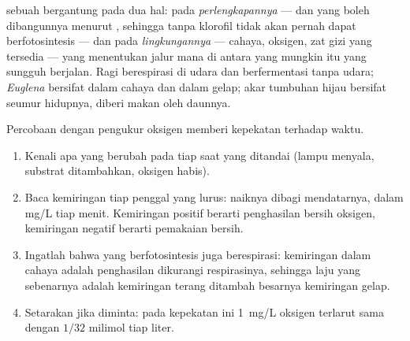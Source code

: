 \begin{proposition}\label{prop:g10:cell-metabolism:decides}
 sebuah  bergantung pada dua hal: pada
\emph{perlengkapannya} ---  dan  yang boleh dibangunnya
menurut , sehingga  tanpa klorofil tidak akan pernah dapat
berfotosintesis --- dan pada \emph{lingkungannya} --- cahaya, oksigen,
zat gizi yang tersedia --- yang menentukan jalur mana di antara yang
mungkin itu yang sungguh berjalan. Ragi berespirasi di udara dan
berfermentasi tanpa udara; \emph{Euglena} bersifat  dalam
cahaya dan  dalam gelap;  akar tumbuhan hijau bersifat
 seumur hidupnya, diberi makan oleh daunnya.
\end{proposition}
\admitted

\begin{method}\label{met:g10:cell-metabolism:trace}
Percobaan dengan pengukur oksigen memberi kepekatan terhadap waktu.
\begin{enumerate}
  \item Kenali apa yang berubah pada tiap saat yang ditandai (lampu
        menyala, substrat ditambahkan, oksigen habis).
  \item Baca kemiringan tiap penggal yang lurus: naiknya dibagi
        mendatarnya, dalam \unit{mg/L} tiap menit. Kemiringan positif
        berarti penghasilan bersih oksigen, kemiringan negatif berarti
        pemakaian bersih.
  \item Ingatlah bahwa  yang berfotosintesis juga berespirasi:
        kemiringan dalam cahaya adalah penghasilan dikurangi
        respirasinya, sehingga laju  yang sebenarnya adalah
        kemiringan terang ditambah besarnya kemiringan gelap.
  \item Setarakan jika diminta: pada kepekatan ini \qty{1}{mg/L}
        oksigen terlarut sama dengan $1/32$ milimol tiap liter.
\end{enumerate}
\end{method}

